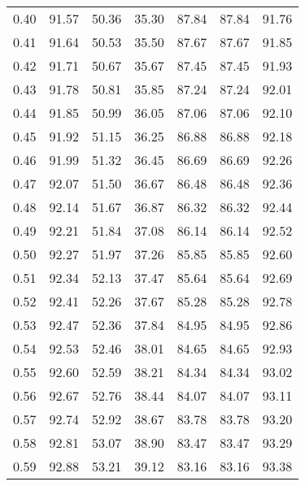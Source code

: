 \begin{tabular}{|c|c|c|c|c|c|c|}
      0.40 &     91.57 &     50.36 &      35.30 &   87.84 &      87.84 &         91.76 \\
      0.41 &     91.64 &     50.53 &      35.50 &   87.67 &      87.67 &         91.85 \\
      0.42 &     91.71 &     50.67 &      35.67 &   87.45 &      87.45 &         91.93 \\
      0.43 &     91.78 &     50.81 &      35.85 &   87.24 &      87.24 &         92.01 \\
      0.44 &     91.85 &     50.99 &      36.05 &   87.06 &      87.06 &         92.10 \\
      0.45 &     91.92 &     51.15 &      36.25 &   86.88 &      86.88 &         92.18 \\
      0.46 &     91.99 &     51.32 &      36.45 &   86.69 &      86.69 &         92.26 \\
      0.47 &     92.07 &     51.50 &      36.67 &   86.48 &      86.48 &         92.36 \\
      0.48 &     92.14 &     51.67 &      36.87 &   86.32 &      86.32 &         92.44 \\
      0.49 &     92.21 &     51.84 &      37.08 &   86.14 &      86.14 &         92.52 \\
      0.50 &     92.27 &     51.97 &      37.26 &   85.85 &      85.85 &         92.60 \\
      0.51 &     92.34 &     52.13 &      37.47 &   85.64 &      85.64 &         92.69 \\
      0.52 &     92.41 &     52.26 &      37.67 &   85.28 &      85.28 &         92.78 \\
      0.53 &     92.47 &     52.36 &      37.84 &   84.95 &      84.95 &         92.86 \\
      0.54 &     92.53 &     52.46 &      38.01 &   84.65 &      84.65 &         92.93 \\
      0.55 &     92.60 &     52.59 &      38.21 &   84.34 &      84.34 &         93.02 \\
      0.56 &     92.67 &     52.76 &      38.44 &   84.07 &      84.07 &         93.11 \\
      0.57 &     92.74 &     52.92 &      38.67 &   83.78 &      83.78 &         93.20 \\
      0.58 &     92.81 &     53.07 &      38.90 &   83.47 &      83.47 &         93.29 \\
      0.59 &     92.88 &     53.21 &      39.12 &   83.16 &      83.16 &         93.38 \\

\end{tabular}
